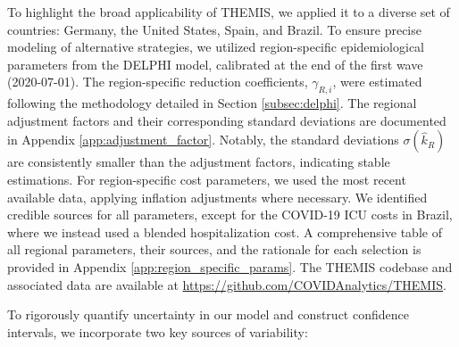 \documentclass[msom,blindrev]{informs3} %
\begin{document}
To highlight the broad applicability of THEMIS, we applied it to a diverse set of countries: Germany, the United States, Spain, and Brazil. To ensure precise modeling of alternative strategies, we utilized region-specific epidemiological parameters from the DELPHI model, calibrated at the end of the first wave (2020-07-01). The region-specific reduction coefficients, $\gamma_{R,i}$, were estimated following the methodology detailed in Section \ref{subsec:delphi}. The regional adjustment factors and their corresponding standard deviations are documented in Appendix \ref{app:adjustment_factor}. Notably, the standard deviations $\sigma(\hat{k}_R)$ are consistently smaller than the adjustment factors, indicating stable estimations. For region-specific cost parameters, we used the most recent available data, applying inflation adjustments where necessary. We identified credible sources for all parameters, except for the COVID-19 ICU costs in Brazil, where we instead used a blended hospitalization cost. A comprehensive table of all regional parameters, their sources, and the rationale for each selection is provided in Appendix \ref{app:region_specific_params}. The THEMIS codebase and associated data are available at \url{https://github.com/COVIDAnalytics/THEMIS}.

To rigorously quantify uncertainty in our model and construct confidence intervals, we incorporate two key sources of variability:
\end{document}
